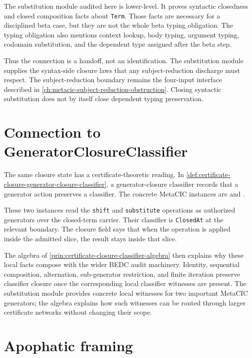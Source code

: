 The substitution module audited here is lower-level. It proves syntactic
closedness and closed composition facts about \texttt{Term}. Those facts are
necessary for a disciplined beta case, but they are not the whole beta typing
obligation. The typing obligation also mentions context lookup, body typing,
argument typing, codomain substitution, and the dependent type assigned after
the beta step.

Thus the connection is a handoff, not an identification. The substitution
module supplies the syntax-side closure laws that any subject-reduction
discharge must respect. The subject-reduction boundary remains the four-input
interface described in \autoref{ch:metacic-subject-reduction-obstruction}.
Closing syntactic substitution does not by itself close dependent typing
preservation.

\section{Connection to GeneratorClosureClassifier}
\label{sec:metacic-substitution-audit-map-generator-closure}

The same closure state has a certificate-theoretic reading. In
\autoref{def:certificate-closure-generator-closure-classifier}, a
generator-closure classifier records that a generator action preserves a
classifier. The concrete MetaCIC instances are
 and
.

These two instances read the \texttt{shift} and \texttt{substitute} operations
as authorized generators over the closed-term carrier. Their classifier is
\texttt{ClosedAt} at the relevant boundary. The closure field says that when
the operation is applied inside the admitted slice, the result stays inside
that slice.

The algebra of \autoref{prin:certificate-closure-classifier-algebra} then
explains why these local facts compose with the wider BEDC audit machinery.
Identity, sequential composition, alternation, sub-generator restriction, and
finite iteration preserve classifier closure once the corresponding local
classifier witnesses are present. The substitution module provides concrete
local witnesses for two important MetaCIC generators; the algebra explains how
such witnesses can be routed through larger certificate networks without
changing their scope.

\section{Apophatic framing}
\label{sec:metacic-substitution-audit-map-apophatic}

